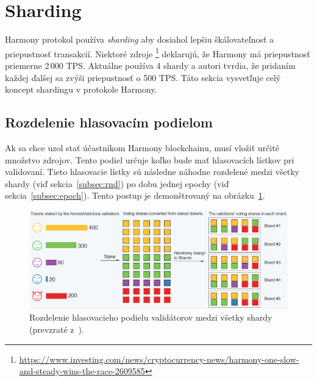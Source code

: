 


\section{Sharding}\label{sec:harmony-shards}

Harmony protokol používa \textit{sharding} aby dosiahol lepšiu škálovateľnosť a priepustnosť transakcií. Niektoré zdroje%
\footnote{\url{https://www.investing.com/news/cryptocurrency-news/harmony-one-slow-and-steady-wins-the-race-2609585}} deklarujú, že Harmony má priepustnosť priemerne 2\,000 TPS. Aktuálne používa 4 shardy a autori tvrdia, že pridaním každej ďalšej sa zvýši priepustnosť o 500 TPS. Táto sekcia vysvetľuje celý koncept shardingu v protokole Harmony.

\subsection{Rozdelenie hlasovacím podielom}\label{subsec:rand-dist}
Ak sa chce uzol stať účastníkom Harmony blockchainu, musí vložiť určité množstvo zdrojov. Tento podiel určuje koľko bude mať hlasovacích lístkov pri validovaní. Tieto hlasovacie lístky sú následne náhodne rozdelené medzi všetky shardy (viď sekcia~\ref{subsec:rnd}) po dobu jednej epochy (viď sekcia~\ref{subsec:epoch}). Tento postup je demonštrovaný na obrázku~\ref{img:harmony-sharding}.

\begin{figure}[bt]
	\centering
	\includegraphics[width=\textwidth]{obrazky-figures/harmony-sharding}
	\caption{Rozdelenie hlasovacieho podielu validátorov medzi všetky shardy (prevzraté z~\cite{harmonyDoc}).}
	\label{img:harmony-sharding}
\end{figure}

